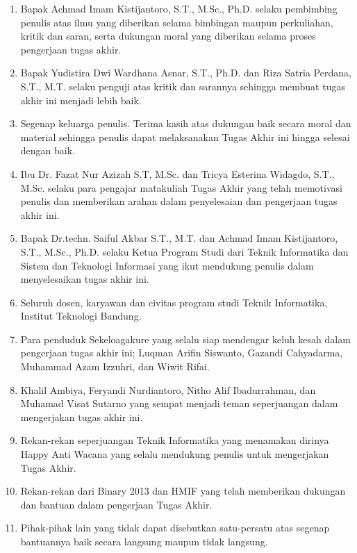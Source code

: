 \begin{enumerate}
    \item Bapak Achmad Imam Kistijantoro, S.T., M.Sc., Ph.D. selaku pembimbing penulis atas ilmu yang diberikan selama bimbingan maupun perkuliahan, kritik dan saran, serta dukungan moral yang diberikan selama proses pengerjaan tugas akhir.

    \item Bapak Yudistira Dwi Wardhana Asnar, S.T., Ph.D. dan Riza Satria Perdana, S.T., M.T. selaku penguji atas kritik dan sarannya sehingga membuat tugas akhir ini menjadi lebih baik.

    \item Segenap keluarga penulis. Terima kasih atas dukungan baik secara moral dan material sehingga penulis dapat melaksanakan Tugas Akhir ini hingga selesai dengan baik.
    
    \item Ibu Dr. Fazat Nur Azizah S.T, M.Sc. dan Tricya Esterina Widagdo, S.T., M.Sc. selaku para pengajar matakuliah Tugas Akhir yang telah memotivasi penulis dan memberikan arahan dalam penyelesaian dan pengerjaan tugas akhir ini.
    
	\item Bapak Dr.techn. Saiful Akbar S.T., M.T. dan Achmad Imam Kistijantoro, S.T., M.Sc., Ph.D. selaku Ketua Program Studi dari Teknik Informatika dan Sistem dan Teknologi Informasi yang ikut mendukung penulis dalam menyelesaikan tugas akhir ini.
    
    \item Seluruh dosen, karyawan dan civitas program studi Teknik Informatika, Institut Teknologi Bandung.
    
    \item Para penduduk Sekeloagakure yang selalu siap mendengar keluh kesah dalam pengerjaan tugas akhir ini; Luqman Arifin Siswanto, Gazandi Cahyadarma, Muhammad Azam Izzuhri, dan Wiwit Rifai.

    \item Khalil Ambiya, Feryandi Nurdiantoro, Nitho Alif Ibadurrahman, dan Muhamad Visat Sutarno yang sempat menjadi teman seperjuangan dalam mengerjakan tugas akhir ini.
    
    \item Rekan-rekan seperjuangan Teknik Informatika yang menamakan dirinya Happy Anti Wacana yang selalu mendukung penulis untuk mengerjakan Tugas Akhir.
    
    \item Rekan-rekan dari Binary 2013 dan HMIF yang telah memberikan dukungan dan bantuan dalam pengerjaan Tugas Akhir.
    
    \item Pihak-pihak lain yang tidak dapat disebutkan satu-persatu atas segenap bantuannya baik secara langsung maupun tidak langsung.
\end{enumerate}


